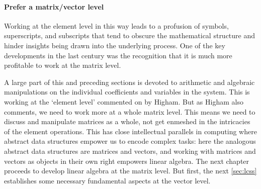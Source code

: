 \paragraph{Prefer a matrix/vector level}
\begin{quoted}{\cite[\S2]{Higham2015b}}
Working at the element level in this way leads to a profusion of symbols, superscripts, and subscripts that tend to obscure the mathematical structure and hinder insights being drawn into the underlying process.
One of the key developments in the last century was the recognition that it is much more profitable to work at the matrix level.
\end{quoted}

A large part of this and preceding sections is devoted to arithmetic and algebraic manipulations on the individual coefficients and variables in the system. 
This is working at the `element level' commented on by Higham.
But as Higham also comments, we need to work more at a whole matrix level.
This means we need to discuss and manipulate matrices as a whole, not  get enmeshed in the intricacies of the element operations.
This has close intellectual parallels in computing where abstract data structures empower us to encode complex tasks: here the analogous abstract data structures are matrices and vectors, and working with matrices and vectors as objects in their own right empowers linear algebra.
The next chapter proceeds to develop linear algebra at the matrix level.
But first, the next \autoref{sec:lcss} establishes some necessary fundamental aspects at the vector level.




\sectionExercises


